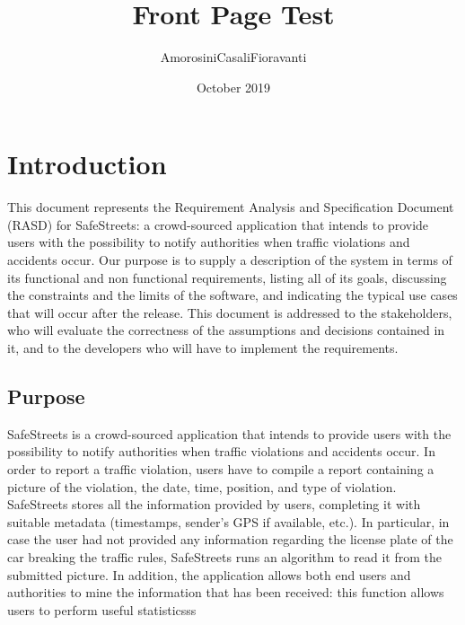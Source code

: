\documentclass{report}
\title{Front Page Test}
\author{AmorosiniCasaliFioravanti}
\date{October 2019}
\begin{document}
\maketitle 
\tableofcontents
\chapter{Introduction}
This document represents the Requirement Analysis and Specification Document (RASD) for SafeStreets: a crowd-sourced application that intends to provide users with the possibility to notify authorities when traffic violations and accidents occur. Our purpose is to supply a description of the system in terms of its functional and non functional requirements, listing all of its goals, discussing the constraints and the limits of the software, and indicating the typical use cases that will occur after the release. This document is addressed to the stakeholders, who will evaluate the correctness of the assumptions and decisions contained in it, and to the developers who will have to implement the requirements.
\section{Purpose}
SafeStreets is a crowd-sourced application that intends to provide users with the possibility to notify authorities when traffic violations and accidents occur. In order to report a traffic violation, users have to compile a report containing a picture of the violation, the date, time, position, and type of violation. SafeStreets stores all the information provided by users, completing it with suitable metadata (timestamps, sender's GPS if available, etc.). In particular, in case the user had not provided any information regarding the license plate of the car breaking the traffic rules, SafeStreets runs an algorithm to read it from the submitted picture. In addition, the application allows both end users and authorities to mine the information that has been received: this function allows users to perform useful statisticsss
\end{document}
